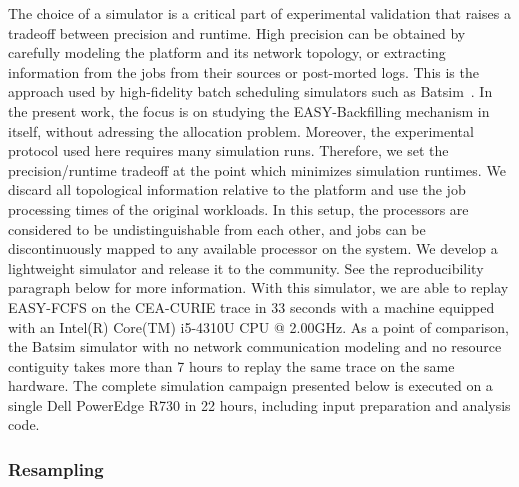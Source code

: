 \documentclass[sigconf,anonymous]{acmart}
\begin{document}
The choice of a simulator is a critical part of experimental validation that
raises a tradeoff between precision and runtime. High precision can be obtained
by carefully modeling the platform and its network topology, or extracting
information from the jobs from their sources or post-morted logs. This is the
approach used by high-fidelity batch scheduling simulators such as
Batsim~\cite{batsim}. In the present work, the focus is on studying the
EASY-Backfilling mechanism in itself, without adressing the allocation problem.
Moreover, the experimental protocol used here requires many simulation runs.
Therefore, we set the precision/runtime tradeoff at the point which minimizes
simulation runtimes. We discard all topological information relative to the
platform and use the job processing times of the original workloads. In this
setup, the processors are considered to be undistinguishable from each other,
and jobs can be discontinuously mapped to any available processor on the
system. We develop a lightweight simulator\cite{ocst} and release it to the
community. See the reproducibility paragraph below for more information.  With
this simulator, we are able to replay EASY-FCFS on the CEA-CURIE trace in 33
seconds with a machine equipped with an Intel(R) Core(TM) i5-4310U CPU @
2.00GHz. As a point of comparison, the Batsim simulator with no network
communication modeling and no resource contiguity takes more than 7 hours to
replay the same trace on the same hardware. The complete simulation campaign
presented below is executed on a single Dell PowerEdge R730 in 22 hours,
including input preparation and analysis code.

\subsubsection{Resampling}
\label{ssub:resampling}
\end{document}
